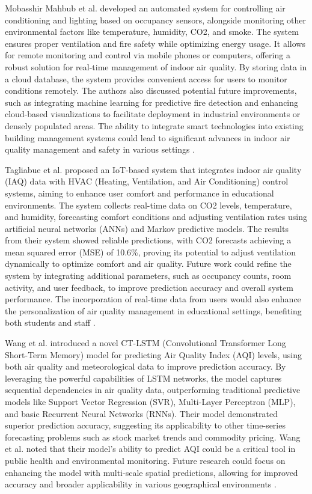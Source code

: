 Mobasshir Mahbub et al. developed an automated system for controlling air conditioning and lighting based on occupancy sensors, alongside monitoring other environmental factors like temperature, humidity, CO2, and smoke. The system ensures proper ventilation and fire safety while optimizing energy usage. It allows for remote monitoring and control via mobile phones or computers, offering a robust solution for real-time management of indoor air quality. By storing data in a cloud database, the system provides convenient access for users to monitor conditions remotely. The authors also discussed potential future improvements, such as integrating machine learning for predictive fire detection and enhancing cloud-based visualizations to facilitate deployment in industrial environments or densely populated areas. The ability to integrate smart technologies into existing building management systems could lead to significant advances in indoor air quality management and safety in various settings \cite{3}.

Tagliabue et al. proposed an IoT-based system that integrates indoor air quality (IAQ) data with HVAC (Heating, Ventilation, and Air Conditioning) control systems, aiming to enhance user comfort and performance in educational environments. The system collects real-time data on CO2 levels, temperature, and humidity, forecasting comfort conditions and adjusting ventilation rates using artificial neural networks (ANNs) and Markov predictive models. The results from their system showed reliable predictions, with CO2 forecasts achieving a mean squared error (MSE) of 10.6\%, proving its potential to adjust ventilation dynamically to optimize comfort and air quality. Future work could refine the system by integrating additional parameters, such as occupancy counts, room activity, and user feedback, to improve prediction accuracy and overall system performance. The incorporation of real-time data from users would also enhance the personalization of air quality management in educational settings, benefiting both students and staff \cite{4}.

Wang et al. introduced a novel CT-LSTM (Convolutional Transformer Long Short-Term Memory) model for predicting Air Quality Index (AQI) levels, using both air quality and meteorological data to improve prediction accuracy. By leveraging the powerful capabilities of LSTM networks, the model captures sequential dependencies in air quality data, outperforming traditional predictive models like Support Vector Regression (SVR), Multi-Layer Perceptron (MLP), and basic Recurrent Neural Networks (RNNs). Their model demonstrated superior prediction accuracy, suggesting its applicability to other time-series forecasting problems such as stock market trends and commodity pricing. Wang et al. noted that their model's ability to predict AQI could be a critical tool in public health and environmental monitoring. Future research could focus on enhancing the model with multi-scale spatial predictions, allowing for improved accuracy and broader applicability in various geographical environments \cite{5}.

